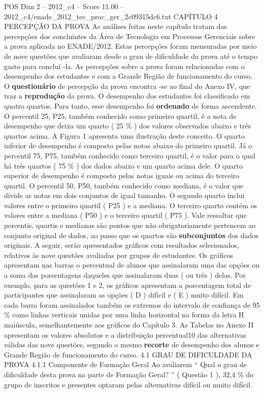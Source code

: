\begin{textsample}{POS Dim 2 – 2012\_c4 – Score 11.00 – 2012\_c4/enade\_2012\_tec\_proc\_ger\_2c09315dc6.txt}  \label{ex:f2_pos_109}
CAPÍTULO 4 PERCEPÇÃO DA PROVA As análises feitas neste capítulo tratam das percepções dos concluintes da Área de Tecnologia em Processos Gerenciais sobre a prova aplicada no ENADE/2012.
Estas percepções foram mensuradas por meio de nove questões que avaliaram desde o grau de dificuldade da prova até o tempo gasto para concluí -la.
As percepções sobre a prova foram relacionadas com o desempenho dos estudantes e com a Grande Região de funcionamento do curso.
O \textbf{questionário} de percepção da prova encontra -se ao final do Anexo IV, que traz a \textbf{reprodução} da prova.
O desempenho dos estudantes foi classificado em quatro quartos.
Para tanto, esse desempenho foi \textbf{ordenado} de forma ascendente.
O percentil 25, P25, também conhecido como primeiro quartil, é a nota de desempenho que deixa um quarto ( 25 \% ) dos valores observados abaixo e três quartos acima.
A Figura 1 apresenta uma ilustração deste conceito.
O quarto inferior de desempenho é composto pelas notas abaixo do primeiro quartil.
Já o percentil 75, P75, também conhecido como terceiro quartil, é o valor para o qual há três quartos ( 75 \% ) dos dados abaixo e um quarto acima dele.
O quarto superior de desempenho é composto pelas notas iguais ou acima do terceiro quartil.
O percentil 50, P50, também conhecido como mediana, é o valor que divide as notas em dois conjuntos de igual tamanho.
O segundo quarto inclui valores entre o primeiro quartil ( P25 ) e a mediana.
O terceiro quarto contém os valores entre a mediana ( P50 ) e o terceiro quartil ( P75 ).
Vale ressaltar que percentis, quartis e medianas são pontos que não obrigatoriamente pertencem ao conjunto original de dados, ao passo que os quartos são \textbf{subconjuntos} dos dados originais.
A seguir, serão apresentados gráficos com resultados selecionados, relativos às nove questões avaliadas por grupos de estudantes.
Os gráficos apresentam nas barras o percentual de alunos que assinalaram uma das opções ou a soma das porcentagens daqueles que assinalaram duas ( ou três ) delas.
Por exemplo, para as questões 1 e 2, os gráficos apresentam a porcentagem total de participantes que assinalaram as opções ( D ) difícil e ( E ) muito difícil.
Em cada barra foram assinalados também os extremos do intervalo de confiança de 95 \% como linhas verticais unidas por uma linha horizontal na forma da letra H maiúscula, semelhantemente aos gráficos do Capítulo 3.
As Tabelas no Anexo II apresentam os valores absolutos e a distribuição percentual10 das alternativas válidas das nove questões, segundo o mesmo \textbf{recorte} de desempenho dos alunos e Grande Região de funcionamento do curso. 4.1 GRAU DE DIFICULDADE DA PROVA 4.1.1 Componente de Formação Geral Ao avaliarem “ Qual o grau de dificuldade desta prova na parte de Formação Geral? ” ( Questão 1 ), 32,4 \% do grupo de inscritos e presentes optaram pelas alternativas difícil ou muito difícil.

\end{textsample}
